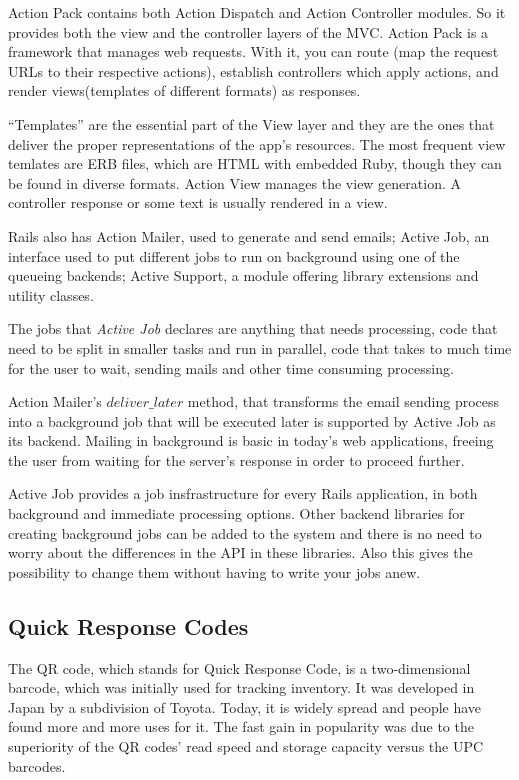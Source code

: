 Action Pack contains both Action Dispatch and Action Controller modules. So it provides both the view and the controller layers of the MVC. Action Pack is a framework that manages web requests. With it, you can route (map the request URLs to their respective actions), establish controllers which apply actions, and render views(templates of different formats) as responses.

``Templates'' are the essential part of the View layer and they are the ones that deliver the  proper representations of the app's resources. The most frequent view temlates are ERB files, which are HTML with embedded Ruby, though they can be found in diverse formats. Action View manages the view generation. A controller response or some text is usually rendered in a view.
 
Rails also has Action Mailer, used to generate and send emails; Active Job, an interface used to put different jobs to run on background using one of the queueing backends; Active Support, a module offering library extensions and utility classes.

The jobs that \textit{Active Job} declares are anything that needs processing, code that need to be split in smaller tasks and run in parallel, code that takes to much time for the user to wait, sending mails and other time consuming processing. 

Action Mailer's $deliver\_later$ method, that transforms the email sending process into a background job that will be executed later is supported by Active Job as its backend. Mailing in background is basic in today's web applications, freeing the user from waiting for the server's response in order to proceed further.
  
Active Job provides a job insfrastructure for every Rails application, in both background and immediate processing options. Other backend libraries for creating background jobs can be added to the system and there is no need to worry about the differences in the API in these libraries. Also this gives the possibility to change them without having to write your jobs anew.




\subsection{Quick Response Codes}
The QR code, which stands for Quick Response Code, is a two-dimensional barcode, which was initially used for tracking inventory. It was developed in Japan by a subdivision of Toyota. Today, it is widely spread and people have found more and more uses for it. The fast gain in popularity was due to the superiority of the QR codes’ read speed and storage capacity versus the UPC barcodes.


